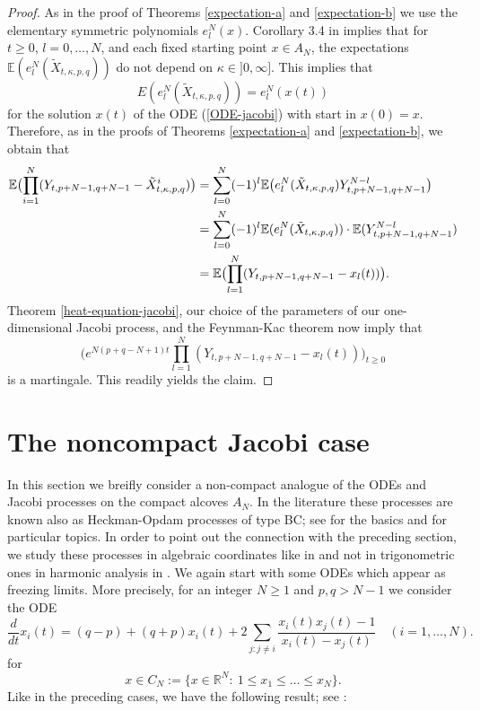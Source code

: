 \documentclass[reqno]{amsart}
\theoremstyle{plain}
\theoremstyle{definition}
\numberwithin{equation}{section}
\begin{document}
\begin{proof}
As in the proof of Theorems \ref{expectation-a} and  \ref{expectation-b} we use the elementary
symmetric polynomials $e_l^N(x)$. Corollary 3.4 in \cite{V2} implies that
 for  $t\ge0$, $l=0,\ldots,N$, and each fixed starting point $x\in A_N$,
 the expectations
$\mathbb E( e_l^N(\tilde X_{t,\kappa,p,q}) )$ do not depend on $\kappa\in]0,\infty]$. This implies that
 $$E( e_l^N(\tilde X_{t,\kappa,p,q}))=  e_l^N(x(t))$$
 for the solution $x(t)$ of the ODE (\ref{ODE-jacobi}) with start in
 $x(0)=x$.
 Therefore, as in the proofs of  Theorems \ref{expectation-a} and  \ref{expectation-b}, we obtain  that
 \begin{align}\label{det-computation-jacobi}
\mathbb E\bigl(\prod_{i=1}^N (    Y_{t,p+N-1,q+N-1}- \tilde X_{t,\kappa,p,q}^i)\bigr)&=
\sum_{l=0}^N (-1)^l\mathbb E\bigl(e_l^N( \tilde X_{t,\kappa,p,q} )  Y_{t,p+N-1,q+N-1}^{N-l}\bigr)\notag\\
&=\sum_{l=0}^N (-1)^l\mathbb E(e_l^N( \tilde  X_{t,\kappa,p,q})) \cdot\mathbb E(Y_{t,p+N-1,q+N-1}^{N-l})\notag\\
&=\mathbb E\bigl(\prod_{l=1}^N ( Y_{t,p+N-1,q+N-1}- x_l(t))\bigr) .
\notag\end{align}
Theorem \ref{heat-equation-jacobi}, our choice of the parameters of our one-dimensional Jacobi process, and the Feynman-Kac theorem now imply that
$$\bigl(e^{N(p+q-N+1)t}\prod_{l=1}^N ( Y_{t,p+N-1,q+N-1}- x_l(t))\bigr)_{t\ge0}$$ is a martingale. This readily yields the claim.
\end{proof}

\section{The noncompact Jacobi case}

In this section we breifly consider a non-compact analogue of the ODEs and Jacobi processes on the compact alcoves $A_N$.
In the literature these processes are known also as Heckman-Opdam processes of type BC; see  \cite{Sch1, Sch2} for the basics and \cite{AVW, RV2, V3}
for particular topics. In order to point out the  connection with the preceding section, we study these processes in algebraic
coordinates like in  \cite{AVW, RV2, V3}
and not in trigonometric ones  in harmonic analysis in \cite{HO, HS, Sch1, Sch2}.
We again start with some ODEs which appear as freezing limits. More precisely, for an integer $N\ge1$ and  $p, q>N-1$ we consider the ODE
\begin{equation}\label{ODE_main-noncompact}
		\frac{d}{dt}x_i(t)
		=(q-p)+(q+p)x_i(t)
			+2\sum_{j: j\neq i}\frac{x_i(t)
			x_j(t)-1}{x_i(t)-x_j(t)} \quad (i=1,\dots,N).
\end{equation}
for 
$$x\in C_N:=\{x\in\mathbb R^N: \> 1\le x_1\le \ldots\le x_N\}.$$
Like in the preceding cases, we have the following result; see \cite{AVW}:
\end{document}
